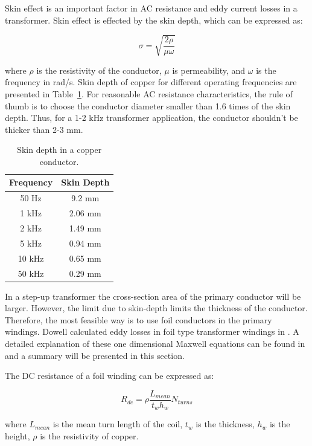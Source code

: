\documentclass[a4paper, 11pt]{article} %
\begin{document}
Skin effect is an important factor in AC resistance and eddy current losses in a transformer. Skin effect is effected by the skin depth, which can be expressed as:

\begin{equation}
  \sigma = \sqrt{\frac{2\rho}{\mu \omega}}
\end{equation}

where $\rho$ is the resistivity of the conductor, $\mu$ is permeability, and $\omega$ is the frequency in rad/s. Skin depth of copper for different operating frequencies are presented in Table~\ref{skin-depth}. For reasonable AC resistance characteristics, the rule of thumb is to choose the conductor diameter smaller than 1.6 times of the skin depth. Thus, for a 1-2 kHz transformer application, the conductor shouldn't be thicker than 2-3 mm. 

\begin{table}[]
\begin{center}
\begin{tabular}{cc}
Frequency & Skin Depth \\
\hline
50 Hz & 9.2 mm \\
1 kHz & 2.06 mm \\
2 kHz & 1.49 mm \\
5 kHz & 0.94 mm \\
10 kHz & 0.65 mm \\
50 kHz & 0.29 mm \\
\hline
\end{tabular} 
\end{center}
\caption{Skin depth in a copper conductor.}
\label{skin-depth}
\end{table}

In a step-up transformer the cross-section area of the primary conductor will be larger. However, the limit due to skin-depth limits the thickness of the conductor. Therefore, the most feasible way is to use foil conductors in the primary windings. 
Dowell calculated eddy losses in foil type transformer windings in \cite{Dowell1966}. A detailed explanation of these one dimensional Maxwell equations can be found in \cite{Villar2010} and a summary will be presented in this section.

The DC resistance of a foil winding can be expressed as:

\begin{equation}
  R_{dc} = \rho \frac{L_{mean}}{t_w h_w} N_{turns}
\end{equation}

where $L_{mean}$ is the mean turn length of the coil, $t_w$ is the thickness, $h_w$ is the height, $\rho$ is the resistivity of copper.
\end{document}
